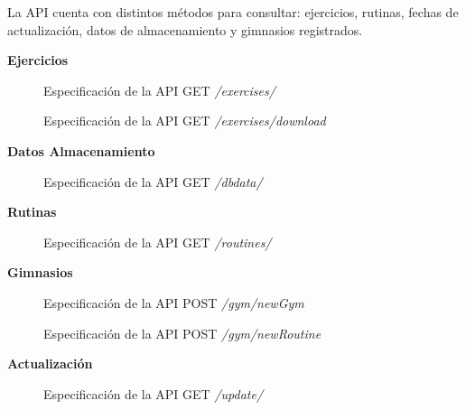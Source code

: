 \documentclass[11pt,a4paper]{report}
\begin{document}
La API cuenta con distintos métodos para consultar: ejercicios, rutinas, fechas de actualización, datos de almacenamiento y gimnasios registrados.
\newpage\par \textbf{Ejercicios}
\begin{figure}[H]
	\centering
	
	\caption{Especificación de la API GET \textit{/exercises/}}
	\label{cod:getExe}
\end{figure}
\begin{figure}[H]
	\centering
	
	\caption{Especificación de la API GET \textit{/exercises/download}}
	\label{cod:getDow}
\end{figure}
\newpage\par \textbf{Datos Almacenamiento}

\begin{figure}[H]
	\centering
	
	\caption{Especificación de la API GET \textit{/dbdata/}}
	\label{cod:getDbd}
\end{figure}
\par \textbf{Rutinas}
\begin{figure}[H]
	\centering
	
	\caption{Especificación de la API GET \textit{/routines/}}
	\label{cod:getRou}
\end{figure}
\par \textbf{Gimnasios}
\begin{figure}[H]
	\centering
	
	\caption{Especificación de la API POST \textit{/gym/newGym}}
	\label{cod:posGym}
\end{figure}
\begin{figure}[H]
	\centering
	
	\caption{Especificación de la API POST \textit{/gym/newRoutine}}
	\label{cod:posRut}
\end{figure}
\par \textbf{Actualización}
\begin{figure}[H]
	\centering
	
	\caption{Especificación de la API GET \textit{/update/}}
	\label{cod:getDat}
\end{figure}
\end{document}
